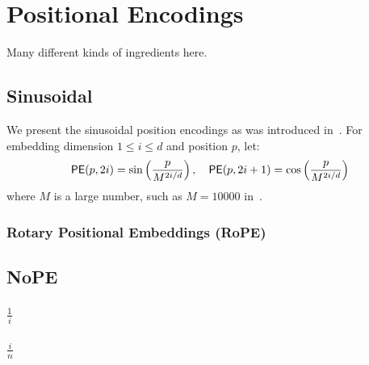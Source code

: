 %
\chapter{Positional Encodings}
%

Many different kinds of ingredients here.

\section{Sinusoidal}

We present the sinusoidal position encodings as was introduced in~\citep{vaswani-etal-2017-attention}.
For embedding dimension \(1 \leq i \leq d\) and position \(p\), let:
\begin{align*}
    \mathsf{PE}(p, 2i) = \sin\left(\frac{p}{M^{2i/d}}\right),
    \quad
    \mathsf{PE}(p, 2i+1) = \cos\left(\frac{p}{M^{2i/d}}\right)
\end{align*}
where \(M\) is a large number, such as \(M = 10000\) in~\citep{vaswani-etal-2017-attention}.

\subsection{Rotary Positional Embeddings (RoPE)}
\cite{su2024roformer}




\section{NoPE}

\subsection{$\frac{1}{i}$}


\subsection{$\frac{i}{n}$}
 

